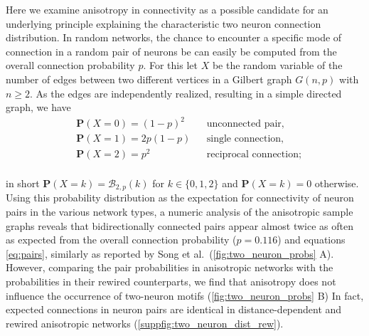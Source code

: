 
Here we examine anisotropy in connectivity as a possible candidate for
an underlying principle explaining the characteristic two neuron
connection distribution. In random networks, the chance to encounter a
specific mode of connection in a random pair of neurons be can easily
be computed from the overall connection probability $p$. For this let
$X$ be the random variable of the number of edges between two
different vertices in a Gilbert graph $G(n,p)$ with $n \ge 2$. As the
edges are independently realized, resulting in a simple directed
graph, we have
\vspace{0.1cm}
\begin{equation}
  \label{eq:pairs}
  \begin{aligned}%
    & \mathbf{P}(X=0) = (1-p)^2    &&\text{unconnected pair,}  \\
    & \mathbf{P}(X=1) = 2p(1-p)    &&\text{single connection,}\\
    & \mathbf{P}(X=2) = p^2        &&\text{reciprocal connection};
  \end{aligned}%
\end{equation}
\vspace{0.1cm} \\
in short $\mathbf{P}(X=k) = \mathcal{B}_{2,p}(k)$ for $k \in
\{0,1,2\}$ and $\mathbf{P}(X=k) = 0$ otherwise. Using this probability
distribution as the expectation for connectivity of neuron pairs in
the various network types, a numeric analysis of the anisotropic
sample graphs reveals that bidirectionally connected pairs appear
almost twice as often as expected from the overall connection
probability ($p=0.116$) and equations \ref{eq:pairs}, similarly as
reported by Song et al.~(\autoref{fig:two_neuron_probs} A). However,
comparing the pair probabilities in anisotropic networks with the
probabilities in their rewired counterparts, we find that anisotropy
does not influence the occurrence of two-neuron motifs
(\autoref{fig:two_neuron_probs} B) In fact, expected connections in
neuron pairs are identical in distance-dependent and rewired
anisotropic networks (\autoref{suppfig:two_neuron_dist_rew}).


